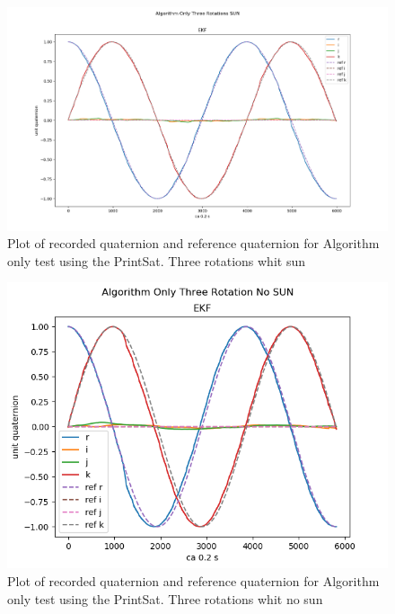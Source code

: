 \begin{figure}[tbp]
	\centering
	\includegraphics[width=1\columnwidth]{./Pictures/cdrRun3ThreeRotationsSun}
	\caption{Plot of recorded quaternion and reference quaternion for Algorithm only test using the PrintSat. Three rotations whit sun}
	\label{fig:cdr3RotSun}
\end{figure}               

\begin{figure}[tbp]
	\centering
	\includegraphics[width=1\columnwidth]{./Pictures/cdrRun3ThreeRotationsNoSun}
	\caption{Plot of recorded quaternion and reference quaternion for Algorithm only test using the PrintSat. Three rotations whit  no sun}
	\label{fig:cdr3RotNoSun}
\end{figure}

